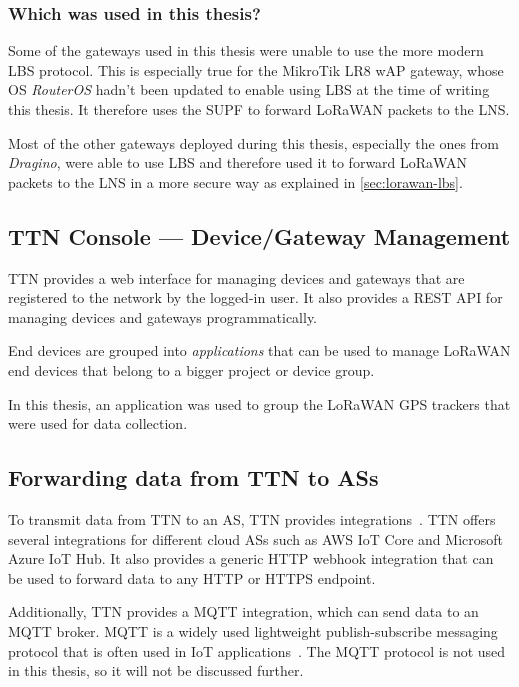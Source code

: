 \subsubsection{Which was used in this thesis?}

Some of the gateways used in this thesis were unable to use the more modern \acl{LBS} protocol.
This is especially true for the MikroTik LR8 wAP gateway, whose \ac{OS} \emph{RouterOS} hadn't been updated to enable using \ac{LBS} at the time of writing this thesis.
It therefore uses the \ac{SUPF} to forward \ac{LoRaWAN} packets to the \ac{LNS}.

Most of the other gateways deployed during this thesis, especially the ones from \emph{Dragino}, were able to use \ac{LBS} and therefore used it to forward \ac{LoRaWAN} packets to the \ac{LNS} in a more secure way as explained in \cref{sec:lorawan-lbs}.

\subsection{\acs{TTN} Console --- Device/Gateway Management}\label{sec:web-interface-and-device-gateway-management}

\ac{TTN} provides a web interface for managing devices and gateways that are registered to the network by the logged-in user.
It also provides a \ac{REST} \ac{API} for managing devices and gateways programmatically.

End devices are grouped into \emph{applications} that can be used to manage \ac{LoRaWAN} end devices that belong to a bigger project or device group.

In this thesis, an application was used to group the \ac{LoRaWAN} \ac{GPS} trackers that were used for data collection.

\subsection{Forwarding data from \acs{TTN} to \aclp{AS}}\label{sec:forwarding-data-from-ttn-to-as}

To transmit data from \ac{TTN} to an \ac{AS}, \ac{TTN} provides integrations~\cite{the_things_network_integrations_2021}.
\ac{TTN} offers several integrations for different cloud \acp{AS} such as \ac{AWS} IoT Core and Microsoft Azure IoT Hub.
It also provides a generic \ac{HTTP} webhook integration that can be used to forward data to any \ac{HTTP} or \ac{HTTPS} endpoint.

Additionally, \ac{TTN} provides a MQTT integration, which can send data to an MQTT broker.
MQTT is a widely used lightweight publish-subscribe messaging protocol that is often used in \ac{IoT} applications~\cite{mqtt_mqtt_2022}.
The MQTT protocol is not used in this thesis, so it will not be discussed further.

